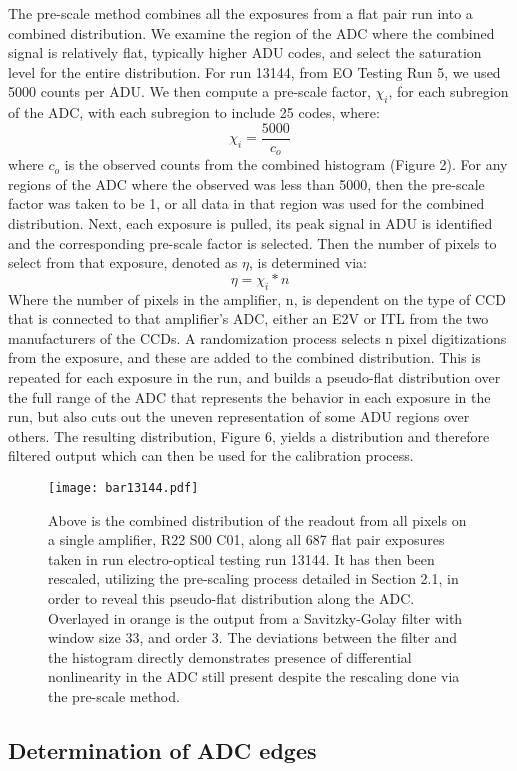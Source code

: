 \documentclass[11pt, letterpaper]{article}
\begin{document}
The pre-scale method combines all the exposures from a flat pair run into a combined distribution. 
We examine the region of the ADC where the combined signal is relatively flat, typically higher ADU codes, and select the saturation level for the entire distribution. 
For run 13144, from EO Testing Run 5, we used 5000 counts per ADU. 
 We then compute a pre-scale factor, $\chi _i$, for each subregion of the ADC, with each subregion to include 25 codes, where:
  \[ \chi_i = \frac{5000}{c_o}\]
where $c_o$ is the observed counts from the combined histogram (Figure 2). 
For any regions of the ADC where the observed was less than 5000, then the pre-scale factor was taken to be 1, or all data in that region was used for the combined distribution. 
Next, each exposure is pulled, its peak signal in ADU is identified and the corresponding pre-scale factor is selected. 
Then the number of pixels to select from that exposure, denoted as $\eta $, is determined via: 
\[ \eta = \chi_i *n \]
Where the number of pixels in the amplifier, n, is dependent on the type of CCD that is connected to that amplifier's ADC, either an E2V or ITL from the two manufacturers of the CCDs. 
A randomization process selects n pixel digitizations from the exposure, and these are added to the combined distribution. 
This is repeated for each exposure in the run, and builds a pseudo-flat distribution over the full range of the ADC that represents the behavior in each exposure in the run, but also cuts out the uneven representation of some ADU regions over others. 
The resulting distribution, Figure 6, yields a distribution and therefore filtered output which can then be used for the calibration process. 


\begin{figure}
	\texttt{[image: bar13144.pdf]}
	\caption{Above is the combined distribution of the readout from all pixels on a single amplifier, R22 S00 C01, along all 687 flat pair exposures taken in run electro-optical testing 	run 13144. It has then been rescaled, utilizing the pre-scaling process detailed in Section 2.1, in order to reveal this pseudo-flat distribution along the ADC. Overlayed in orange is the output from a Savitzky-Golay filter with window size 33, and order 3. The deviations between the filter and the histogram directly demonstrates presence of differential nonlinearity in the ADC still present despite the rescaling done via the pre-scale method.}
\end{figure}

\subsection{Determination of ADC edges} 	
\indent
\end{document}
